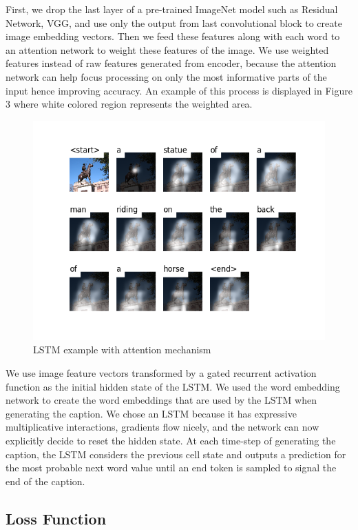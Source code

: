 \documentclass{article}
\begin{document}
First, we drop the last layer of a pre-trained ImageNet model such as Residual Network, VGG, and use only the output from last convolutional block to create image embedding vectors. Then we feed these features along with each word to an attention network to weight these features of the image. We use weighted features instead of raw features generated from encoder, because the attention network can help focus processing on only the most informative parts of the input hence improving accuracy. An example of this process is displayed in Figure 3 where white colored region represents the weighted area.

\graphicspath{ {./images/} }
\begin{figure}[!htb]
    \centering
    \includegraphics[scale=0.5]{images/lstmex.png}
    \caption{LSTM example with attention mechanism}
    \label{fig:my_label}
\end{figure}

We use image feature vectors transformed by a gated recurrent activation function as the initial hidden state of the LSTM. We used the word embedding network to create the word embeddings that are used by the LSTM when generating the caption. We chose an LSTM because it has expressive multiplicative interactions, gradients flow nicely, and the network can now explicitly decide to reset the hidden state. At each time-step of generating the caption, the LSTM considers the previous cell state and outputs a prediction for the most probable next word value until an end token is sampled to signal the end of the caption.

\subsection{Loss Function}
\end{document}
